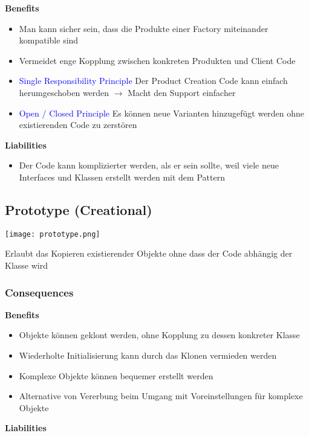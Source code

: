 \textbf{Benefits}
\begin{itemize}
    \item Man kann sicher sein, dass die Produkte einer Factory miteinander kompatible sind
    \item Vermeidet enge Kopplung zwischen konkreten Produkten und Client Code
    \item \textcolor{blue}{Single Responsibility Principle} Der Product Creation Code kann einfach herumgeschoben werden $\rightarrow$ Macht den Support einfacher
    \item \textcolor{blue}{Open / Closed Principle} Es können neue Varianten hinzugefügt werden ohne existierenden Code
    zu zerstören
\end{itemize}
\vspace{10pt}
\textbf{Liabilities}

\begin{itemize}
    \item Der Code kann komplizierter werden, als er sein sollte, weil viele neue Interfaces und Klassen erstellt werden mit dem Pattern
\end{itemize}

\subsection{Prototype (Creational)}

\texttt{[image: prototype.png]}

Erlaubt das Kopieren existierender Objekte ohne dass der Code abhängig der Klasse wird

\subsubsection{Consequences}

\textbf{Benefits}
\begin{itemize}
    \item Objekte können geklont werden, ohne Kopplung zu dessen konkreter Klasse
    \item Wiederholte Initialisierung kann durch das Klonen vermieden werden
    \item Komplexe Objekte können bequemer erstellt werden
    \item Alternative von Vererbung beim Umgang mit Voreinstellungen für komplexe Objekte
\end{itemize}
\vspace{10pt}
\textbf{Liabilities}

